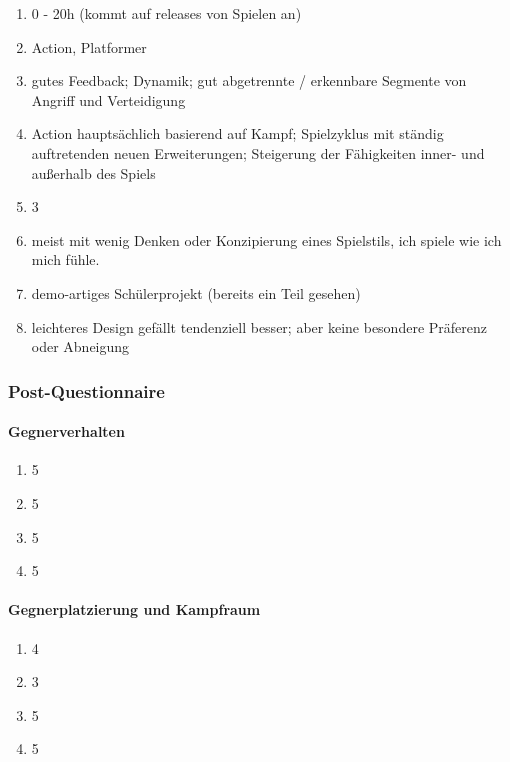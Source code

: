 \documentclass[../Main.tex]{subfiles}
\begin{document}
\begin{enumerate}[label=\textbf{P\arabic*}, leftmargin=1.5cm, itemsep=0.8em]
\item 0 - 20h (kommt auf releases von Spielen an)

\item Action, Platformer

\item gutes Feedback; Dynamik; gut abgetrennte / erkennbare Segmente von Angriff und Verteidigung

\item Action hauptsächlich basierend auf Kampf; Spielzyklus mit ständig auftretenden neuen Erweiterungen; Steigerung der Fähigkeiten inner- und außerhalb des Spiels

\item 3

\item meist mit wenig Denken oder Konzipierung eines Spielstils, ich spiele wie ich mich fühle.

\item demo-artiges Schülerprojekt (bereits ein Teil gesehen)

\item leichteres Design gefällt tendenziell besser; aber keine besondere Präferenz oder Abneigung
\end{enumerate}

\subsubsection{Post-Questionnaire}

\paragraph{Gegnerverhalten}
\begin{enumerate}[label=\textbf{Q\arabic*}, leftmargin=1.5cm, itemsep=0.8em]
\item 5
\item 5
\item 5
\item 5
\end{enumerate}

\paragraph{Gegnerplatzierung und Kampfraum}
\begin{enumerate}[label=\textbf{Q\arabic*}, leftmargin=1.5cm, itemsep=0.8em, resume]
\item 4
\item 3
\item 5
\item 5
\end{enumerate}
\end{document}
